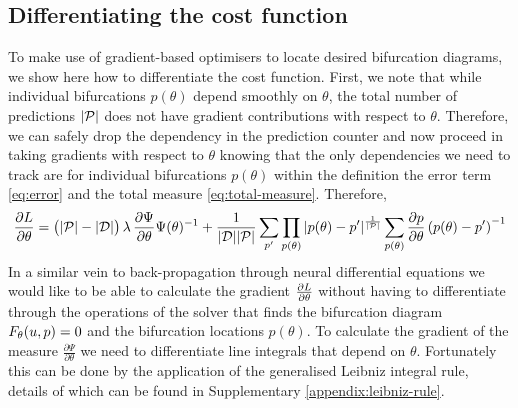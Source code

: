 \documentclass{article}
\begin{document}
\subsection{Differentiating the cost function}

To make use of gradient-based optimisers to locate desired bifurcation diagrams, we show here how to differentiate the cost function. First, we note that while individual bifurcations $p(\theta)$ depend smoothly on $\theta$, the total number of predictions $|\mathcal{P}|$ does not have gradient contributions with respect to $\theta$. Therefore, we can safely drop the dependency in the prediction counter and now proceed in taking gradients with respect to $\theta$ knowing that the only dependencies we need to track are for individual bifurcations $p(\theta)$ within the definition the error term \eqref{eq:error} and the total measure \eqref{eq:total-measure}. Therefore, 
\begin{align}
    \frac{\partial L}{\partial\theta}=
    \big(|\mathcal{P}|-|\mathcal{D}|\big)\,\lambda\,
    \frac{\partial \Psi}{\partial\theta}\Psi(\theta)^{-1}+
    \frac{1}{|\mathcal{D}||\mathcal{P}|}\sum_{p'}
    \prod_{p(\theta)}|p(\theta)-p'|^{\frac{1}{|\mathcal{P}|}}
    \sum_{p(\theta)}\frac{\partial p}{\partial\theta}\left(p(\theta)-p'\right)^{-1}
    \label{eq:gradient-loss}
\end{align}
In a similar vein to back-propagation through neural differential equations \cite{Chen2018NeuralEquations} we would like to be able to calculate the gradient $\frac{\partial L}{\partial\theta}$ without having to differentiate through the operations of the solver that finds the bifurcation diagram $F_{\theta}(u,p)=0$ and the bifurcation locations $p(\theta)$. To calculate the gradient of the measure $\frac{\partial \Psi}{\partial\theta}$ we need to differentiate line integrals that depend on $\theta$. Fortunately this can be done by the application of the generalised Leibniz integral rule, details of which can be found in Supplementary \ref{appendix:leibniz-rule}.
\end{document}
